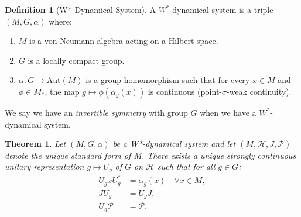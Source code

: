 \documentclass{article}
\newtheorem{theorem}{Theorem}
\theoremstyle{definition}
\newtheorem{definition}{Definition}[section]
\begin{document}
  \begin{definition}[W*-Dynamical System]
    A $W^{*}$-dynamical system is a triple $(M, G, \alpha)$ where:
    \begin{enumerate}
      \item $M$ is a von Neumann algebra acting on a Hilbert space.

      \item $G$ is a locally compact group.

      \item $\alpha: G \to \mathrm{Aut}(M)$ is a group homomorphism such that for
        every $x \in M$ and $\phi \in M_{*}$, the map
        $g \mapsto \phi(\alpha_{g}(x))$ is continuous (point-$\sigma$-weak continuity).
    \end{enumerate}
  \end{definition}
  We say we have an {\it invertible symmetry} with group $G$ when we have a $W^{*}$-dynamical
  system.

  \begin{theorem}
    Let $(M, G, \alpha)$ be a W*-dynamical system and let
    $(M, \mathcal{H}, J, \mathcal{P})$ denote the unique standard form of $M$. There
    exists a unique strongly continuous unitary representation $g \mapsto U_{g}$
    of $G$ on $\mathcal{H}$ such that for all $g \in G$:
    \begin{align}
      U_{g}x U_{g}^{*} & = \alpha_{g}(x) \quad \forall x \in M, \\
      J U_{g}          & = U_{g}J,                              \\
      U_{g}\mathcal{P} & = \mathcal{P}.
    \end{align}
  \end{theorem}
\end{document}
